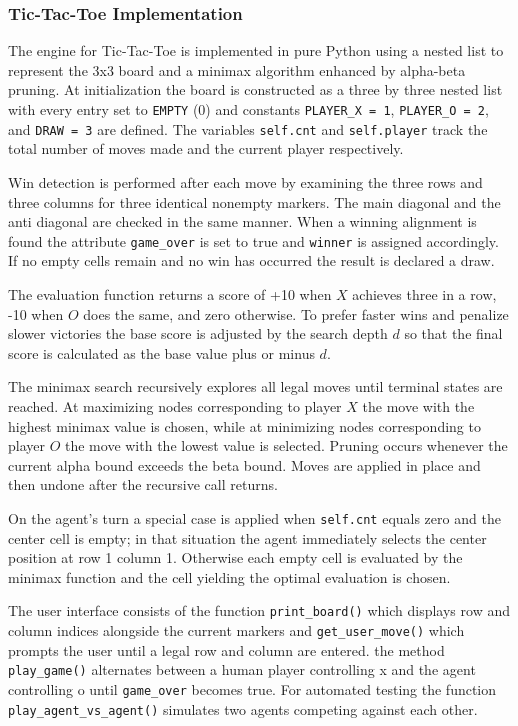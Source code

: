 \documentclass[12pt]{article}
\begin{document}
\subsubsection{Tic-Tac-Toe Implementation}

The engine for Tic-Tac-Toe is implemented in pure Python using a nested list to represent the 3x3 board and a minimax algorithm enhanced by alpha-beta pruning. At initialization the board is constructed as a three by three nested list with every entry set to \texttt{EMPTY} (0) and constants \texttt{PLAYER\_X = 1}, \texttt{PLAYER\_O = 2}, and \texttt{DRAW = 3} are defined. The variables \texttt{self.cnt} and \texttt{self.player} track the total number of moves made and the current player respectively.

Win detection is performed after each move by examining the three rows and three columns for three identical nonempty markers. The main diagonal and the anti diagonal are checked in the same manner. When a winning alignment is found the attribute \texttt{game\_over} is set to true and \texttt{winner} is assigned accordingly. If no empty cells remain and no win has occurred the result is declared a draw.

The evaluation function returns a score of +10 when $X$ achieves three in a row, -10 when $O$ does the same, and zero otherwise. To prefer faster wins and penalize slower victories the base score is adjusted by the search depth \(d\) so that the final score is calculated as the base value plus or minus \(d\).

The minimax search recursively explores all legal moves until terminal states are reached. At maximizing nodes corresponding to player $X$ the move with the highest minimax value is chosen, while at minimizing nodes corresponding to player $O$ the move with the lowest value is selected. Pruning occurs whenever the current alpha bound exceeds the beta bound. Moves are applied in place and then undone after the recursive call returns.

On the agent’s turn a special case is applied when \texttt{self.cnt} equals zero and the center cell is empty; in that situation the agent immediately selects the center position at row 1 column 1. Otherwise each empty cell is evaluated by the minimax function and the cell yielding the optimal evaluation is chosen.

The user interface consists of the function \texttt{print\_board()} which displays row and column indices alongside the current markers and \texttt{get\_user\_move()} which prompts the user until a legal row and column are entered. the method \texttt{play\_game()} alternates between a human player controlling x and the agent controlling o until \texttt{game\_over} becomes true. For automated testing the function \texttt{play\_agent\_vs\_agent()} simulates two agents competing against each other.
\end{document}
